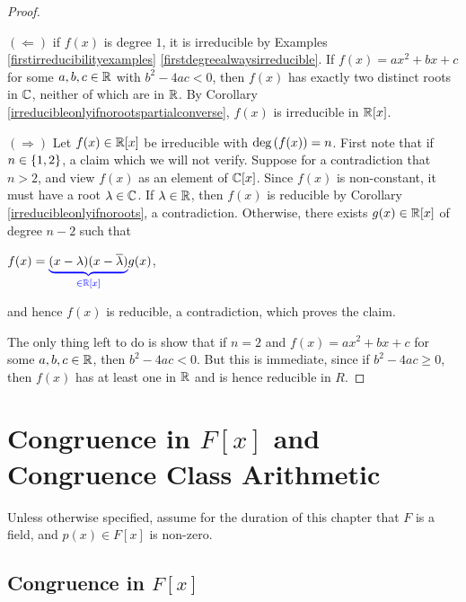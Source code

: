 \documentclass[11pt,fleqn,dvipsnames,usenames]{article}
\newcommand{\p}{\noindent}
\begin{document}
\begin{proof}~

\p $(\Leftarrow)$ if $f(x)$ is degree $1$, it is irreducible by Examples \ref{firstirreducibilityexamples} \ref{firstdegreealwaysirreducible}.  If $f(x) = ax^2 + bx + c$ for some $a,b,c\in\mathbb{R}$ with $b^2 - 4ac < 0$, then $f(x)$ has exactly two distinct roots in $\mathbb{C}$, neither of which are in $\mathbb{R}$.  By Corollary \ref{irreducibleonlyifnorootspartialconverse}, $f(x)$ is irreducible in $\mathbb{R}[x]$.
\vsp

\p $(\Rightarrow)$ Let $f(x)\in\mathbb{R}[x]$ be irreducible with $\text{deg}\left(f(x)\right) = n$.  First note that if $n\in\left\{1,2\right\}$, a claim which we will not verify.  Suppose for a contradiction that $n>2$, and view $f(x)$ as an element of $\mathbb{C}[x]$.  Since $f(x)$ is non-constant, it must have a root $\lambda\in\mathbb{C}$.  If $\lambda\in\mathbb{R}$, then $f(x)$ is reducible by Corollary \ref{irreducibleonlyifnoroots}, a contradiction.  Otherwise, there exists $g(x)\in\mathbb{R}[x]$ of degree $n-2$ such that
\begin{center}
$f(x) = {\color{blue}\underbrace{{\color{black}(x-\lambda)(x-\overline{\lambda})}}_{\in\mathbb{R}[x]}}g(x)$,
\end{center}
and hence $f(x)$ is reducible, a contradiction, which proves the claim.
\vsp

\p The only thing left to do is show that if $n=2$ and $f(x) = ax^2 + bx + c$ for some $a,b,c\in\mathbb{R}$, then $b^2 - 4ac < 0$.  But this is immediate, since if $b^2 - 4ac\geq 0$, then $f(x)$ has at least one in $\mathbb{R}$ and is hence reducible in $R$.
\end{proof}
%
\section{Congruence in $F[x]$ and Congruence Class Arithmetic}

\p Unless otherwise specified, assume for the duration of this chapter that $F$ is a field, and $p(x)\in F[x]$ is non-zero.

\subsection{Congruence in $F[x]$}
\end{document}
